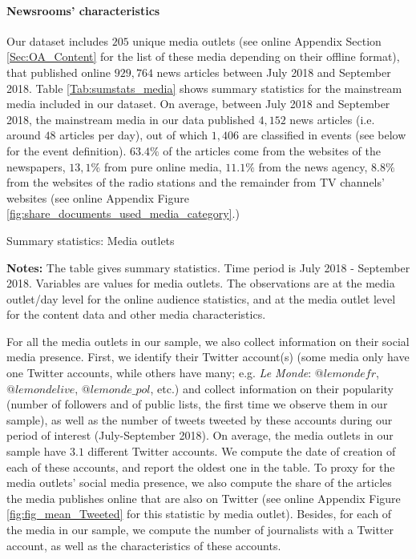 \paragraph{Newsrooms' characteristics}

Our dataset includes $205$ unique media outlets (see online Appendix Section \ref{Sec:OA_Content} for the list of these media depending on their offline format), that published online $929,764$ news articles between July 2018 and September 2018. Table \ref{Tab:sumstats_media} shows summary statistics for the mainstream media included in our dataset. On average, between July 2018 and September 2018, the mainstream media in our data published $4,152$ news articles (i.e. around $48$ articles per day), out of which $1,406$ are classified in events (see below for the event definition). $63.4\%$ of the articles come from the websites of the newspapers,  $13,1\%$ from pure online media, $11.1\%$ from the news agency, $8.8\%$ from the websites of the radio stations and the remainder from TV channels' websites (see online Appendix Figure \ref{fig:share_documents_used_media_category}.)


\begin{table}
\caption{Summary statistics: Media outlets}
\begin{center}
	
\end{center}
\begin{spacing}{0.5}
	{\fns \textbf{Notes:} The table gives summary statistics. Time period is July 2018 - September 2018. Variables are values for media outlets. The observations are at the media outlet/day level for the online audience statistics, and at the media outlet level for the content data and other media characteristics.} 
\end{spacing}
\label{Tab:sumstats_media}
\end{table} 


For all the media outlets in our sample, we also collect information on their social media presence. First, we identify their Twitter account(s) (some media only have one Twitter accounts, while others have many; e.g. \textit{Le Monde}: $@lemondefr$, $@lemondelive$, $@lemonde\_pol$, etc.) and collect information on their popularity (number of followers and of public lists, the first time we observe them in our sample), as well as  the number of tweets tweeted by these accounts during our period of interest (July-September 2018). On average, the media outlets in our sample have $3.1$ different Twitter accounts. We compute the date of creation of each of these accounts, and report the oldest one in the table. To proxy for the media outlets' social media presence,  we also compute the share of the articles the media publishes online that are also on Twitter (see online Appendix Figure \ref{fig:fig_mean_Tweeted} for this statistic by media outlet). Besides, for each of the media in our sample, we compute the number of journalists with a Twitter account, as well as the characteristics of these accounts.

